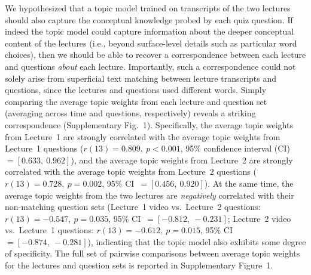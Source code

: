 \documentclass[10pt]{article}
\newcommand{\topicWeights}{1}
\begin{document}
We hypothesized that a topic model trained on transcripts of the two lectures
should also capture the conceptual knowledge probed by each quiz question. If
indeed the topic model could capture information about the deeper conceptual
content of the lectures (i.e., beyond surface-level details such as particular
word choices), then we should be able to recover a correspondence between each
lecture and questions \textit{about} each lecture. Importantly, such a
correspondence could not solely arise from superficial text matching between
lecture transcripts and questions, since the lectures and questions used
different words. Simply comparing the average topic weights from each lecture
and question set (averaging across time and questions, respectively) reveals a
striking correspondence (Supplementary Fig.~\topicWeights). Specifically, the average topic
weights from Lecture~1 are strongly correlated with the average topic weights
from Lecture~1 questions ($r(13) = 0.809,~p < 0.001$, 95\% confidence interval
(CI)~$= [0.633,~0.962]$), and the average topic weights from Lecture~2 are
strongly correlated with the average topic weights from Lecture~2 questions
($r(13) = 0.728,~p = 0.002$, 95\% CI~$= [0.456,~0.920]$). At the same time, the
average topic weights from the two lectures are \textit{negatively} correlated with 
their non-matching question sets (Lecture~1 video vs.~Lecture~2 questions: $r(13) = 
-0.547,~p = 0.035$, 95\% CI~$= [-0.812, ~-0.231]$; Lecture~2 video vs.~Lecture~1 questions: $r(13) 
= -0.612,~p = 0.015$, 95\% CI~$= [-0.874,~-0.281]$), indicating that the topic model
also exhibits some degree of specificity. The full set of pairwise comparisons
between average topic weights for the lectures and question sets is reported in
Supplementary Figure~\topicWeights.
\end{document}
